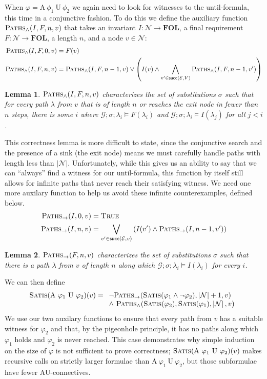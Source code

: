 \documentclass{eptcs}
\newtheorem{lemma}{Lemma}
\newcommand{\AU}[2]{\textrm{A}\ #1\ \textrm{U}\ #2}
\newcommand{\foctlmod}[4]{#1;#2;#3\vDash #4}
\newcommand{\satis}[1]{\textsc{Satis}(#1)}
\newcommand{\PathsForward}[3]{\textsc{Paths}_{\rightarrow}(#1,#2,#3)}
\newcommand{\PathsAndRaw}{\textsc{Paths}_{\land}}
\newcommand{\PathsAnd}[4]{\PathsAndRaw(#1,#2,#3,#4)}
\newcommand{\successors}[2]{\mathsf{succ}(#1,#2)}
\newcommand{\card}[1]{\ensuremath{\left|#1\right|}}
\newcommand{\FOL}{\textbf{FOL}}
\begin{document}
When $\varphi=\AU{\phi_1}{\phi_2}$ we again need to look for witnesses to the until-formula, this time in a
conjunctive fashion. To do this we define the auxiliary function $\PathsAnd{I}{F}{n}{v}$ that takes an invariant
$I\colon\mathcal{N}\to\FOL$, a final requirement $F\colon\mathcal{N}\to\FOL$, a length
$n$, and a node $v\in\mathcal{N}$:
\begin{align*}
\PathsAnd{I}{F}{0}{v}&=F(v)\\
\PathsAnd{I}{F}{n}{v}&=\PathsAnd{I}{F}{n-1}{v}
                     \lor\left(I(v)\land\bigwedge_{v'\in\successors{\mathcal{E}}{V}}\PathsAnd{I}{F}{n - 1}{v'}\right)
\end{align*}
\begin{lemma}\label{lem:pathsand}
$\PathsAnd{I}{F}{n}{v}$ characterizes the set of substitutions $\sigma$ such that
for every path $\lambda$ from $v$ that is of length $n$ or reaches the exit node in fewer than $n$ steps,
there is some $i$ where $\foctlmod{\mathcal{G}}{\sigma}{\lambda_i}{F(\lambda_i)}$ and $\foctlmod{\mathcal{G}}{\sigma}{\lambda_i}{I(\lambda_j)}$ for all $j < i$.
\end{lemma}
This correctness lemma is more difficult to state, since the conjunctive search and the
presence of a sink (the exit node) means we must carefully handle paths with length less than
$|\mathcal{N}|$. Unfortunately, while this gives us an ability to say that we can ``always''
find a witness for our until-formula, this function by itself still allows for infinite paths that
never reach their satisfying witness. We need one more auxilary function to
help us avoid these infinite counterexamples, defined below.
\begin{align*}
\PathsForward{I}{0}{v}&=\textsc{True}\\
\PathsForward{I}{n}{v}&=\bigvee_{v'\in\successors{\mathcal{E}}{v}}\left(I(v')
                               \land\PathsForward{I}{n-1}{v'}\right)
\end{align*}

\begin{lemma}\label{lem:pathsforward}
$\PathsForward{F}{n}{v}$ characterizes the set of substitutions $\sigma$ such that there is a path $\lambda$ from $v$ of length $n$ along which $\foctlmod{\mathcal{G}}{\sigma}{\lambda_i}{I(\lambda_i)}$ for every $i$.
\end{lemma}
We can then define \[
\satis{\AU{\varphi_1}{\varphi_2}}(v)=\begin{array}[t]{l}
           \neg\PathsForward{\satis{\varphi_1\land\neg\varphi_2}}{\card{\mathcal{N}}+1}{v}\\
           \land\ \PathsAnd{\satis{\varphi_2}}{\satis{\varphi_1}}{\card{\mathcal{N}}}{v}
           \end{array}\]
We use our two auxilary functions to ensure that every path from $v$ has a suitable
witness for $\varphi_2$ and that, by the pigeonhole principle, it has no paths along which $\varphi_1$ holds and $\varphi_2$ is never reached. This case demonstrates why simple induction on the size of $\varphi$ is not sufficient to prove correctness; $\satis{\AU{\varphi_1}{\varphi_2}}(v)$ makes recursive calls on strictly larger formulae than $\AU{\varphi_1}{\varphi_2}$, but those subformulae have fewer AU-connectives.
\end{document}
